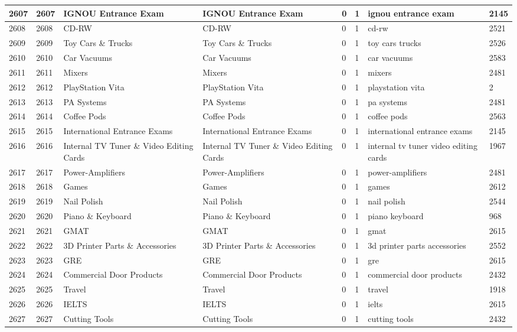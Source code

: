 \begin{longtable}{|l|l|l|l|l|l|l|l|}
2607 & 2607 & IGNOU Entrance Exam & IGNOU Entrance Exam & 0 & 1 & ignou entrance exam & 2145 \\ \hline 
2608 & 2608 & CD-RW & CD-RW & 0 & 1 & cd-rw & 2521 \\ \hline 
2609 & 2609 & Toy Cars \& Trucks & Toy Cars \& Trucks & 0 & 1 & toy cars trucks & 2526 \\ \hline 
2610 & 2610 & Car Vacuums & Car Vacuums & 0 & 1 & car vacuums & 2583 \\ \hline 
2611 & 2611 & Mixers & Mixers & 0 & 1 & mixers & 2481 \\ \hline 
2612 & 2612 & PlayStation Vita & PlayStation Vita & 0 & 1 & playstation vita & 2 \\ \hline 
2613 & 2613 & PA Systems & PA Systems & 0 & 1 & pa systems & 2481 \\ \hline 
2614 & 2614 & Coffee Pods & Coffee Pods & 0 & 1 & coffee pods & 2563 \\ \hline 
2615 & 2615 & International Entrance Exams & International Entrance Exams & 0 & 1 & international entrance exams & 2145 \\ \hline 
2616 & 2616 & Internal TV Tuner \& Video Editing Cards & Internal TV Tuner \& Video Editing Cards & 0 & 1 & internal tv tuner video editing cards & 1967 \\ \hline 
2617 & 2617 & Power-Amplifiers & Power-Amplifiers & 0 & 1 & power-amplifiers & 2481 \\ \hline 
2618 & 2618 & Games & Games & 0 & 1 & games & 2612 \\ \hline 
2619 & 2619 & Nail Polish & Nail Polish & 0 & 1 & nail polish & 2544 \\ \hline 
2620 & 2620 & Piano \& Keyboard & Piano \& Keyboard & 0 & 1 & piano keyboard & 968 \\ \hline 
2621 & 2621 & GMAT & GMAT & 0 & 1 & gmat & 2615 \\ \hline 
2622 & 2622 & 3D Printer Parts \& Accessories & 3D Printer Parts \& Accessories & 0 & 1 & 3d printer parts accessories & 2552 \\ \hline 
2623 & 2623 & GRE & GRE & 0 & 1 & gre & 2615 \\ \hline 
2624 & 2624 & Commercial Door Products & Commercial Door Products & 0 & 1 & commercial door products & 2432 \\ \hline 
2625 & 2625 & Travel & Travel & 0 & 1 & travel & 1918 \\ \hline 
2626 & 2626 & IELTS & IELTS & 0 & 1 & ielts & 2615 \\ \hline 
2627 & 2627 & Cutting Tools & Cutting Tools & 0 & 1 & cutting tools & 2432 \\ \hline 

\end{longtable}
